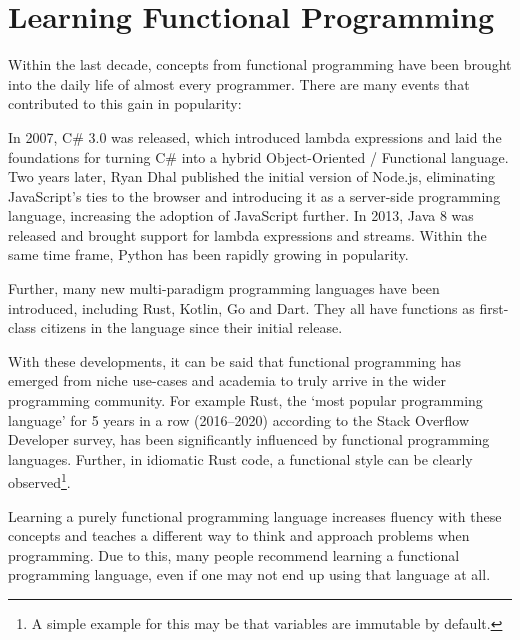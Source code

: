 
\section{Learning Functional Programming}

Within the last decade, concepts from functional programming have been brought into the daily life
of almost every programmer. There are many events that contributed to this gain in popularity:

In 2007, C\# 3.0 was released, which introduced lambda expressions and laid the foundations for
turning C\# into a hybrid Object-Oriented / Functional language\autocite{csharp-functional}.
Two years later, Ryan Dhal published the initial version of Node.js, eliminating JavaScript's
ties to the browser and introducing it as a server-side programming language, increasing the
adoption of JavaScript further.
In 2013, Java 8 was released and brought support for lambda expressions and streams.
Within the same time frame, Python has been rapidly growing in popularity\autocite{python-popularity}.

Further, many new multi-paradigm programming languages have been introduced,
including Rust, Kotlin, Go and Dart. They all have functions as first-class citizens in
the language since their initial release.

With these developments, it can be said that functional programming has emerged
from niche use-cases and academia to truly arrive in the wider programming community.
For example Rust, the `most popular programming language' for 5 years in a row (2016--2020)
according to the Stack Overflow Developer survey\autocite{rust-loved}, has been significantly
influenced by functional programming languages\autocite{rust-functional}. Further, in idiomatic
Rust code, a functional style can be clearly observed\footnote{A simple example for this may be
that variables are immutable by default.}.

Learning a purely functional programming language increases fluency with these concepts and
teaches a different way to think and approach problems when programming. Due to this, many
people recommend learning a functional programming
language\autocite{blog1-funcprog}\autocite{blog2-funcprog}\autocite{blog3-funcprog}\autocite{blog4-funcprog},
even if one may not end up using that language at all\autocite{quora-funcprog}.

